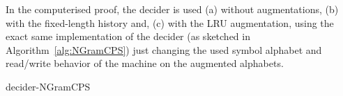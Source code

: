 In the computerised proof, the \ngramcps decider is used (a) without augmentations, (b) with the fixed-length history and, (c) with the LRU augmentation, using the exact same implementation of the decider (as sketched in Algorithm~\ref{alg:NGramCPS}) just changing the used symbol alphabet and read/write behavior of the machine on the augmented alphabets.
\newpage
\newcommand{\leftngram}{left\xspace}
\newcommand{\rightngram}{right\xspace}
\newcommand{\middlesymbol}{middle\xspace}

\begin{algorithm}
    \caption{{\sc decider-NGramCPS}}\label{alg:NGramCPS}

    \begin{algorithmic}[1]


\end{algorithmic}
\end{algorithm}
